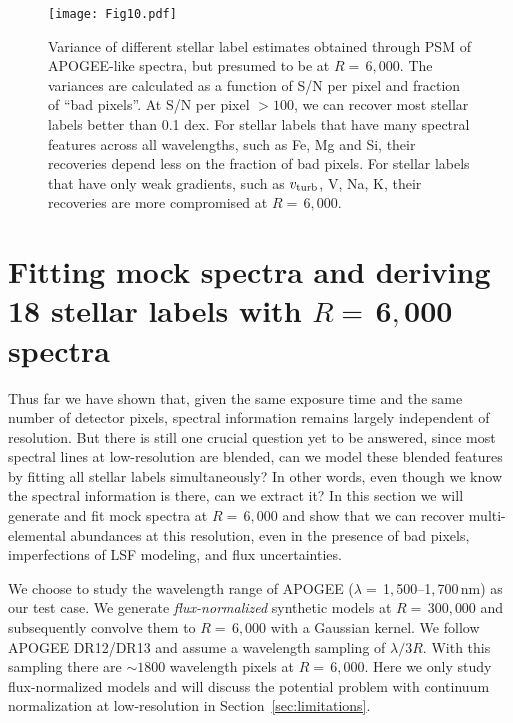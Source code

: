 \documentclass[iop]{emulateapj}
\begin{document}
\begin{CJK*}{UTF8}{gbsn}
\begin{figure*}
\centering
\texttt{[image: Fig10.pdf]}
\caption{Variance of different stellar label estimates obtained through PSM of APOGEE-like spectra, but presumed to be at $R= \,$6$,$000. The variances are calculated as a function of S/N per pixel and fraction of ``bad pixels''. At S/N per pixel $>100$, we can recover most stellar labels better than 0.1 dex. For stellar labels that have many spectral features across all wavelengths, such as Fe, Mg and Si, their recoveries depend less on the fraction of bad pixels. For stellar labels that have only weak gradients, such as $v_{\rm turb}$, V, Na, K, their recoveries are more compromised at $R = \,$6$,$000.}
\label{fig:apogee-low-res-2}
\end{figure*}


%
%
%
%
%
%

\section{Fitting mock spectra and deriving 18 stellar labels with $R= \,$6$,$000 spectra}
\label{sec:real-study}

Thus far we have shown that, given the same exposure time and the same number of detector pixels, spectral information remains largely independent of resolution. But there is still one crucial question yet to be answered, since most spectral lines at low-resolution are blended, can we model these blended features by fitting all stellar labels simultaneously? In other words, even though we know the spectral information is there, can we extract it? In this section we will generate and fit mock spectra at $R = \,$6$,$000 and show that we can recover multi-elemental abundances at this resolution, even in the presence of bad pixels, imperfections of LSF modeling, and flux uncertainties. 

We choose to study the wavelength range of APOGEE ($\lambda = \,$1$,$500--1$,$700$\,$nm) as our test case. We generate {\em flux-normalized} synthetic models at $R = \,$300$,$000 and subsequently convolve them to $R = \,$6$,$000 with a Gaussian kernel. We follow APOGEE DR12/DR13 and assume a wavelength sampling of $\lambda/3R$. With this sampling there are $\sim 1800$ wavelength pixels at $R = \,$6$,$000. Here we only study flux-normalized models and will discuss the potential problem with continuum normalization at low-resolution in Section~\ref{sec:limitations}.


\end{CJK*}
\end{document}

